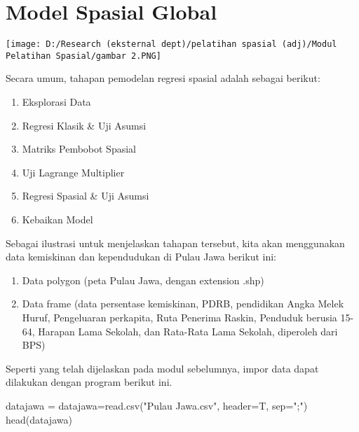 \documentclass[
]{book}
\newenvironment{Shaded}{\begin{snugshade}}{\end{snugshade}}
\newcommand{\AttributeTok}[1]{\textcolor[rgb]{0.77,0.63,0.00}{#1}}
\newcommand{\FunctionTok}[1]{\textcolor[rgb]{0.00,0.00,0.00}{#1}}
\newcommand{\NormalTok}[1]{#1}
\newcommand{\OtherTok}[1]{\textcolor[rgb]{0.56,0.35,0.01}{#1}}
\newcommand{\StringTok}[1]{\textcolor[rgb]{0.31,0.60,0.02}{#1}}
\begin{document}
\hypertarget{model-spasial-global}{%
\section{Model Spasial Global}\label{model-spasial-global}}

\texttt{[image: D:/Research (eksternal dept)/pelatihan spasial (adj)/Modul Pelatihan Spasial/gambar 2.PNG]}

Secara umum, tahapan pemodelan regresi spasial adalah sebagai berikut:

\begin{enumerate}
\def\labelenumi{(\arabic{enumi})}
\item
  Eksplorasi Data
\item
  Regresi Klasik \& Uji Asumsi
\item
  Matriks Pembobot Spasial
\item
  Uji Lagrange Multiplier
\item
  Regresi Spasial \& Uji Asumsi
\item
  Kebaikan Model
\end{enumerate}

Sebagai ilustrasi untuk menjelaskan tahapan tersebut, kita akan menggunakan data kemiskinan dan kependudukan di Pulau Jawa berikut ini:

\begin{enumerate}
\def\labelenumi{\arabic{enumi}.}
\item
  Data polygon (peta Pulau Jawa, dengan extension .shp)
\item
  Data frame (data persentase kemiskinan, PDRB, pendidikan Angka Melek Huruf, Pengeluaran perkapita, Ruta Penerima Raskin, Penduduk berusia 15-64, Harapan Lama Sekolah, dan Rata-Rata Lama Sekolah, diperoleh dari BPS)
\end{enumerate}

Seperti yang telah dijelaskan pada modul sebelumnya, impor data dapat dilakukan dengan program berikut ini.

\begin{Shaded}
\begin{Highlighting}[]
\NormalTok{datajawa }\OtherTok{=}\NormalTok{ datajawa}\OtherTok{=}\FunctionTok{read.csv}\NormalTok{(}\StringTok{"Pulau Jawa.csv"}\NormalTok{, }\AttributeTok{header=}\NormalTok{T, }\AttributeTok{sep=}\StringTok{";"}\NormalTok{)}
\FunctionTok{head}\NormalTok{(datajawa)}
\end{Highlighting}
\end{Shaded}
\end{document}
